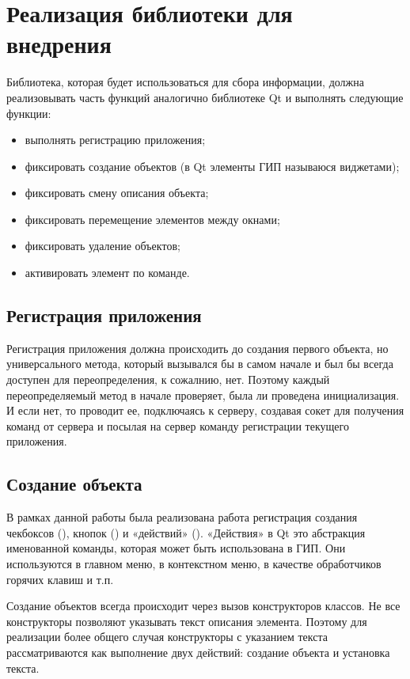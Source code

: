 \section{Реализация библиотеки для внедрения}

Библиотека, которая будет использоваться для сбора информации, должна
реализовывать часть функций аналогично библиотеке Qt и выполнять следующие
функции:

\begin{itemize}
    \item выполнять регистрацию приложения;
    \item фиксировать создание объектов (в Qt элементы ГИП называюся
        виджетами);
    \item фиксировать смену описания объекта;
    \item фиксировать перемещение элементов между окнами;
    \item фиксировать удаление объектов;
    \item активировать элемент по команде.
\end{itemize}

\subsection{Регистрация приложения}

Регистрация приложения должна происходить до создания первого объекта, но
универсального метода, который вызывался бы в самом начале и был бы всегда
доступен для переопределения, к сожалнию, нет. Поэтому каждый переопределяемый
метод в начале проверяет, была ли проведена инициализация. И если нет, то
проводит ее, подключаясь к серверу, создавая сокет для получения команд от
сервера и посылая на сервер команду регистрации текущего приложения.

\subsection{Создание объекта}

В рамках данной работы была реализована работа регистрация создания чекбоксов
(), кнопок () и «действий» ().
«Действия» в Qt это абстракция именованной команды, которая может быть
использована в ГИП\cite{qaction}. Они используются в главном меню, в контекстном
меню, в качестве обработчиков горячих клавиш и т.п.

Создание объектов всегда происходит через вызов конструкторов классов. Не все
конструкторы позволяют указывать текст описания элемента. Поэтому для реализации
более общего случая конструкторы с указанием текста рассматриваются как
выполнение двух действий: создание объекта и установка текста.

